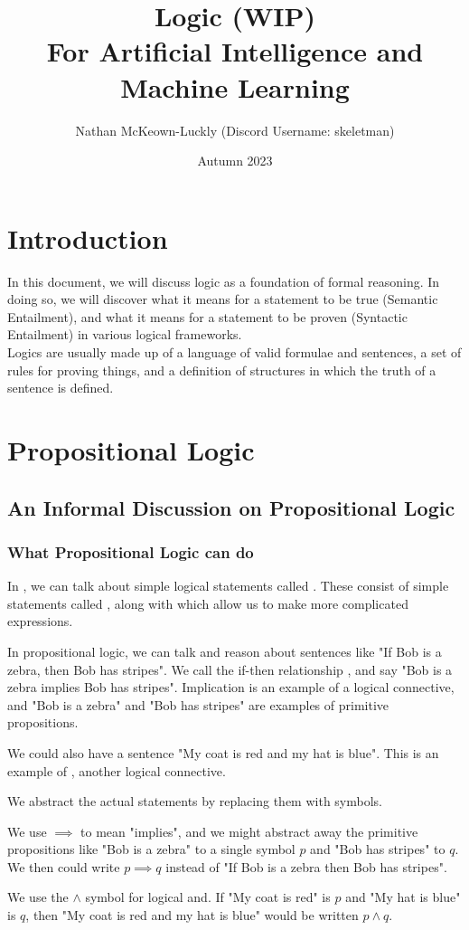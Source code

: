 \documentclass[11pt]{article}
\title{Logic (WIP) \\ {\small For Artificial Intelligence and Machine Learning}}
\date{Autumn 2023}
\author{Nathan McKeown-Luckly (Discord Username: skeletman)}
\begin{document}
\maketitle
\tableofcontents
\pagebreak
\section{Introduction}
In this document, we will discuss logic as a foundation of formal reasoning. In doing so, we will discover what it means for a statement to be true (Semantic Entailment), and what it means for a statement to be proven (Syntactic Entailment) in various logical frameworks.
\\ Logics are usually made up of a language of valid formulae and sentences, a set of rules for proving things, and a definition of structures in which the truth of a sentence is defined.
\section{Propositional Logic}
\subsection{An Informal Discussion on Propositional Logic}
\subsubsection{What Propositional Logic can do}
In , we can talk about simple logical statements called . These consist of simple statements called , along with  which allow us to make more complicated expressions.
\begin{eg}
    In propositional logic, we can talk and reason about sentences like "If Bob is a zebra, then Bob has stripes". We call the if-then relationship , and say "Bob is a zebra implies Bob has stripes". Implication is an example of a logical connective, and "Bob is a zebra" and "Bob has stripes" are examples of primitive propositions.
\end{eg}
\begin{eg}
    We could also have a sentence "My coat is red and my hat is blue". This is an example of , another logical connective.
\end{eg}
We abstract the actual statements by replacing them with symbols.
\begin{eg}
    We use $\implies$ to mean "implies", and we might abstract away the primitive propositions like "Bob is a zebra" to a single symbol $p$ and "Bob has stripes" to $q$. We then could write $p \implies q$ instead of "If Bob is a zebra then Bob has stripes".
\end{eg}
\begin{eg}
    We use the $\wedge$ symbol for logical and. If "My coat is red" is $p$ and "My hat is blue" is $q$, then "My coat is red and my hat is blue" would be written $p \wedge q$.
\end{eg}
\pagebreak
\end{document}
